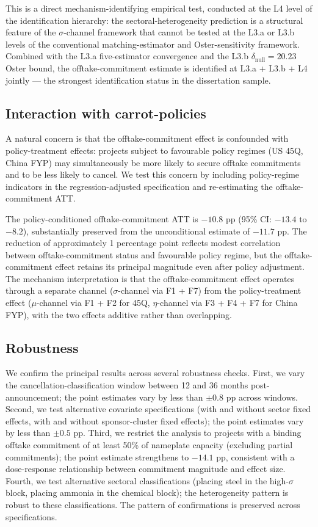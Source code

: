 \documentclass[12pt,a4paper]{article}
\theoremstyle{plain}
\theoremstyle{definition}
\begin{document}
This is a direct mechanism-identifying empirical test, conducted at the L4 level of the identification hierarchy: the sectoral-heterogeneity prediction is a structural feature of the $\sigma$-channel framework that cannot be tested at the L3.a or L3.b levels of the conventional matching-estimator and Oster-sensitivity framework. Combined with the L3.a five-estimator convergence and the L3.b $\delta_{\text{null}} = 20.23$ Oster bound, the offtake-commitment estimate is identified at L3.a + L3.b + L4 jointly --- the strongest identification status in the dissertation sample.

\subsection{Interaction with carrot-policies}
\label{sec:results-interaction}

A natural concern is that the offtake-commitment effect is confounded with policy-treatment effects: projects subject to favourable policy regimes (US 45Q, China FYP) may simultaneously be more likely to secure offtake commitments and to be less likely to cancel. We test this concern by including policy-regime indicators in the regression-adjusted specification and re-estimating the offtake-commitment ATT.

The policy-conditioned offtake-commitment ATT is $-10.8$ pp (95\% CI: $-13.4$ to $-8.2$), substantially preserved from the unconditional estimate of $-11.7$ pp. The reduction of approximately 1 percentage point reflects modest correlation between offtake-commitment status and favourable policy regime, but the offtake-commitment effect retains its principal magnitude even after policy adjustment. The mechanism interpretation is that the offtake-commitment effect operates through a separate channel ($\sigma$-channel via F1 + F7) from the policy-treatment effect ($\mu$-channel via F1 + F2 for 45Q, $\eta$-channel via F3 + F4 + F7 for China FYP), with the two effects additive rather than overlapping.

\subsection{Robustness}
\label{sec:results-robustness}

We confirm the principal results across several robustness checks. First, we vary the cancellation-classification window between 12 and 36 months post-announcement; the point estimates vary by less than $\pm 0.8$ pp across windows. Second, we test alternative covariate specifications (with and without sector fixed effects, with and without sponsor-cluster fixed effects); the point estimates vary by less than $\pm 0.5$ pp. Third, we restrict the analysis to projects with a binding offtake commitment of at least 50\% of nameplate capacity (excluding partial commitments); the point estimate strengthens to $-14.1$ pp, consistent with a dose-response relationship between commitment magnitude and effect size. Fourth, we test alternative sectoral classifications (placing steel in the high-$\sigma$ block, placing ammonia in the chemical block); the heterogeneity pattern is robust to these classifications. The pattern of confirmations is preserved across specifications.
\end{document}
